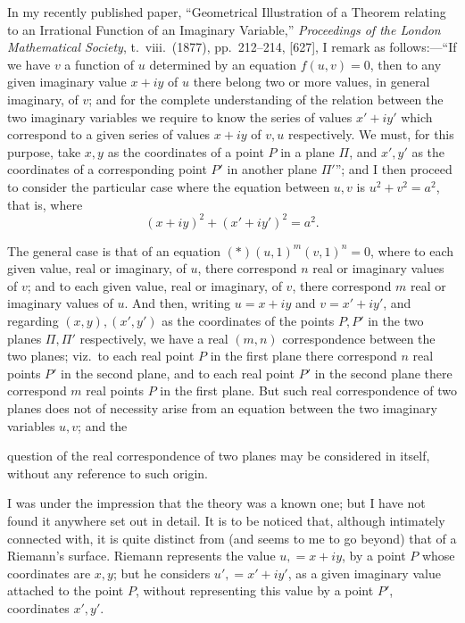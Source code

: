 \documentclass[11pt,a4paper]{article}
\begin{document}
\medskip

In my recently published paper, ``Geometrical Illustration of a Theorem relating to an Irrational Function of an Imaginary Variable,'' \emph{Proceedings of the London Mathematical Society}, t.~viii.\ (1877), pp.~212--214, [627], I remark as follows:---``If we have $v$ a function of $u$ determined by an equation $f(u, v) = 0$, then to any given imaginary value $x + iy$ of $u$ there belong two or more values, in general imaginary, of $v$; and for the complete understanding of the relation between the two imaginary variables we require to know the series of values $x' + iy'$ which correspond to a given series of values $x + iy$ of $v, u$ respectively. We must, for this purpose, take $x, y$ as the coordinates of a point $P$ in a plane $\Pi$, and $x', y'$ as the coordinates of a corresponding point $P'$ in another plane $\Pi'$''; and I then proceed to consider the particular case where the equation between $u, v$ is $u^{2} + v^{2} = a^{2}$, that is, where
\[
(x + iy)^{2} + (x' + iy')^{2} = a^{2}.
\]

The general case is that of an equation $(*)(u, 1)^{m}(v, 1)^{n} = 0$, where to each given value, real or imaginary, of $u$, there correspond $n$ real or imaginary values of $v$; and to each given value, real or imaginary, of $v$, there correspond $m$ real or imaginary values of $u$. And then, writing $u = x + iy$ and $v = x' + iy'$, and regarding $(x, y), (x', y')$ as the coordinates of the points $P, P'$ in the two planes $\Pi, \Pi'$ respectively, we have a real $(m, n)$ correspondence between the two planes; viz.\ to each real point $P$ in the first plane there correspond $n$ real points $P'$ in the second plane, and to each real point $P'$ in the second plane there correspond $m$ real points $P$ in the first plane. But such real correspondence of two planes does not of necessity arise from an equation between the two imaginary variables $u, v$; and the

\newpage


\noindent question of the real correspondence of two planes may be considered in itself, without any reference to such origin.

\medskip

I was under the impression that the theory was a known one; but I have not found it anywhere set out in detail. It is to be noticed that, although intimately connected with, it is quite distinct from (and seems to me to go beyond) that of a Riemann's surface. Riemann represents the value $u, = x + iy$, by a point $P$ whose coordinates are $x, y$; but he considers $u', = x' + iy'$, as a given imaginary value attached to the point $P$, without representing this value by a point $P'$, coordinates $x', y'$.
\end{document}
